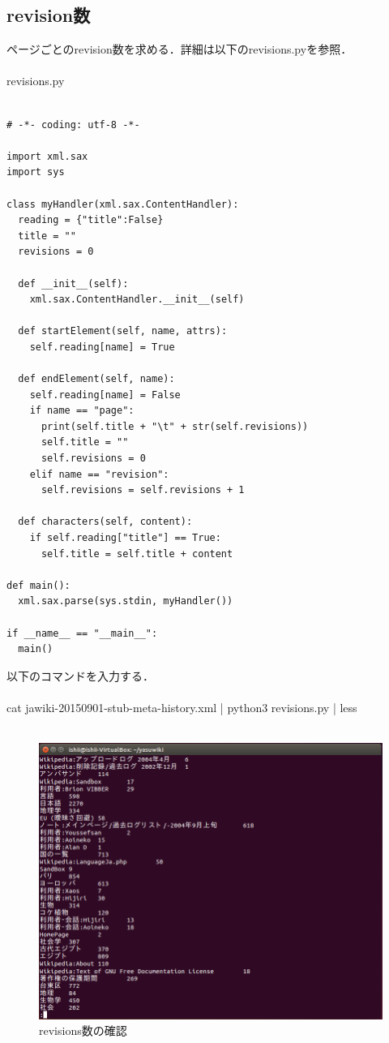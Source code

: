 \subsection{revision数}

ページごとのrevision数を求める．詳細は以下のrevisions.pyを参照． \\
\\
revisions.py

{\small
\begin{verbatim}

# -*- coding: utf-8 -*-

import xml.sax
import sys

class myHandler(xml.sax.ContentHandler):
  reading = {"title":False}
  title = ""
  revisions = 0

  def __init__(self):
    xml.sax.ContentHandler.__init__(self)
 
  def startElement(self, name, attrs):
    self.reading[name] = True
 
  def endElement(self, name):
    self.reading[name] = False
    if name == "page":
      print(self.title + "\t" + str(self.revisions))
      self.title = ""
      self.revisions = 0
    elif name == "revision":
      self.revisions = self.revisions + 1
 
  def characters(self, content):
    if self.reading["title"] == True:
      self.title = self.title + content
  
def main():
  xml.sax.parse(sys.stdin, myHandler())
 
if __name__ == "__main__":
  main()

\end{verbatim}}





以下のコマンドを入力する． \\
\\
cat jawiki-20150901-stub-meta-history.xml | python3 revisions.py | less \\
\\
\begin{figure}[H]
\centering
\includegraphics[width=14cm]{wiki_revisions.png}
\caption{revisions数の確認}\label{サンプル図}
\end{figure}

